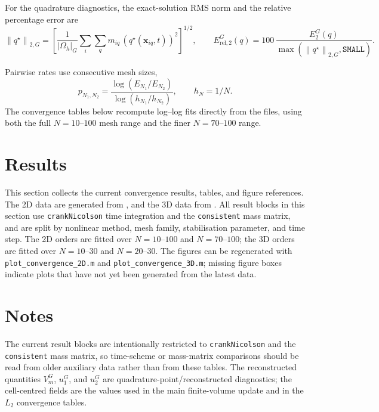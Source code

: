 \documentclass[11pt,a4paper]{article}
\newcommand{\code}[1]{\texttt{\small #1}}
\newcommand{\norm}[1]{\left\lVert #1 \right\rVert}
\begin{document}
For the quadrature diagnostics, the exact-solution RMS norm and the relative
percentage error are
\begin{equation}
  \norm{q^\star}_{2,G}
  =
  \left[
  \frac{1}{|\Omega_h|_G}
  \sum_i\sum_q m_{iq}\,
  \left(q^\star(\mathbf{x}_{iq},t)\right)^2
  \right]^{1/2},
  \qquad
  E_{\mathrm{rel},2}^{G}(q)
  =
  100\,\frac{E_2^G(q)}{\max(\norm{q^\star}_{2,G},\texttt{SMALL})}.
\end{equation}

Pairwise rates use consecutive mesh sizes,
\begin{equation}
p_{N_1,N_2} = \frac{\log(E_{N_1}/E_{N_2})}{\log(h_{N_1}/h_{N_2})}, \qquad h_N=1/N.
\end{equation}
The convergence tables below recompute log--log fits directly from the  files, using both the full $N=10$--$100$ mesh range and the finer $N=70$--$100$ range.


\section{Results}

This section collects the current convergence results, tables, and figure
references. The 2D data are generated from
,
and the 3D data from
.
All result blocks in this section use \code{crankNicolson} time integration and
the \code{consistent} mass matrix, and are split by nonlinear method, mesh
family, stabilisation parameter, and time step. The 2D orders are fitted over
$N=10$--$100$ and $N=70$--$100$; the 3D orders are fitted over $N=10$--$30$
and $N=20$--$30$. The figures can be regenerated with
\code{plot\_convergence\_2D.m} and \code{plot\_convergence\_3D.m}; missing
figure boxes indicate plots that have not yet been generated from the latest
data.





\section{Notes}
The current result blocks are intentionally restricted to \code{crankNicolson}
and the \code{consistent} mass matrix, so time-scheme or mass-matrix
comparisons should be read from older auxiliary data rather than from these
tables. The reconstructed quantities $V_m^G$, $u_1^G$, and $u_2^G$ are
quadrature-point/reconstructed diagnostics; the cell-centred fields are the
values used in the main finite-volume update and in the $L_2$ convergence
tables.
\end{document}
